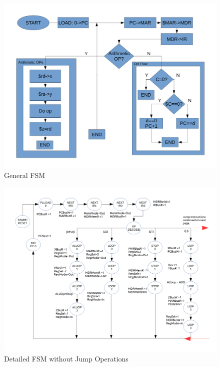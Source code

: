 \documentclass[conference]{IEEEtran}
\begin{document}
\clearpage
\begin{figure}[!t]
\centering
\includegraphics[width=\textwidth]{TopDownDesignDraftp2.pdf}
\caption{General FSM}
\label{fig_sim}
\end{figure}

\clearpage

\begin{figure}[!t]
\centering
\includegraphics[width=\textwidth]{ControlFSMp1.pdf}
\caption{Detailed FSM without Jump Operations}
\label{fig_sim}
\end{figure}


\clearpage
\end{document}
